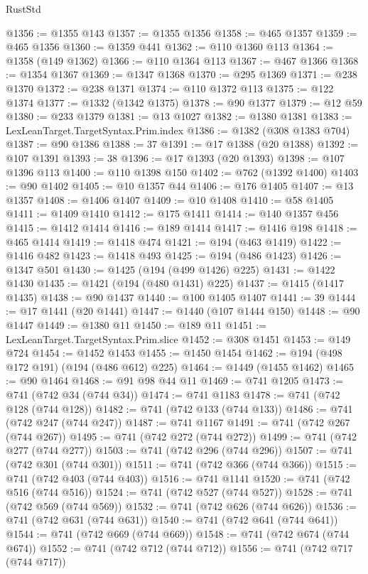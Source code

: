 \begin{lexlean}{RustStd}
\begin{coremodule}
@1356 := @1355 @143
@1357 := @1355 @1356
@1358 := @465 @1357
@1359 := @465 @1356
@1360 := @1359 @441
@1362 := @110 @1360 @113
@1364 := @1358 (@149 @1362)
@1366 := @110 @1364 @113
@1367 := @467 @1366
@1368 := @1354 @1367
@1369 := @1347 @1368
@1370 := @295 @1369
@1371 := @238 @1370
@1372 := @238 @1371
@1374 := @110 @1372 @113
@1375 := @122 @1374
@1377 := @1332 (@1342 @1375)
@1378 := @90 @1377
@1379 := @12 @59
@1380 := @233 @1379
@1381 := @13 @1027
@1382 := @1380 @1381
@1383 := LexLeanTarget.TargetSyntax.Prim.index
@1386 := @1382 (@308 @1383 @704)
@1387 := @90 @1386
@1388 := 37
@1391 := @17 @1388 (@20 @1388)
@1392 := @107 @1391
@1393 := 38
@1396 := @17 @1393 (@20 @1393)
@1398 := @107 @1396 @113
@1400 := @110 @1398 @150
@1402 := @762 (@1392 @1400)
@1403 := @90 @1402
@1405 := @10 @1357 @44
@1406 := @176 @1405
@1407 := @13 @1357
@1408 := @1406 @1407
@1409 := @10 @1408
@1410 := @58 @1405
@1411 := @1409 @1410
@1412 := @175 @1411
@1414 := @140 @1357 @456
@1415 := @1412 @1414
@1416 := @189 @1414
@1417 := @1416 @198
@1418 := @465 @1414
@1419 := @1418 @474
@1421 := @194 (@463 @1419)
@1422 := @1416 @482
@1423 := @1418 @493
@1425 := @194 (@486 @1423)
@1426 := @1347 @501
@1430 := @1425 (@194 (@499 @1426) @225)
@1431 := @1422 @1430
@1435 := @1421 (@194 (@480 @1431) @225)
@1437 := @1415 (@1417 @1435)
@1438 := @90 @1437
@1440 := @100 @1405 @1407
@1441 := 39
@1444 := @17 @1441 (@20 @1441)
@1447 := @1440 (@107 @1444 @150)
@1448 := @90 @1447
@1449 := @1380 @11
@1450 := @189 @11
@1451 := LexLeanTarget.TargetSyntax.Prim.slice
@1452 := @308 @1451
@1453 := @149 @724
@1454 := @1452 @1453
@1455 := @1450 @1454
@1462 := @194 (@498 @172 @191) (@194 (@486 @612) @225)
@1464 := @1449 (@1455 @1462)
@1465 := @90 @1464
@1468 := @91 @98 @44 @11
@1469 := @741 @1205
@1473 := @741 (@742 @34 (@744 @34))
@1474 := @741 @1183
@1478 := @741 (@742 @128 (@744 @128))
@1482 := @741 (@742 @133 (@744 @133))
@1486 := @741 (@742 @247 (@744 @247))
@1487 := @741 @1167
@1491 := @741 (@742 @267 (@744 @267))
@1495 := @741 (@742 @272 (@744 @272))
@1499 := @741 (@742 @277 (@744 @277))
@1503 := @741 (@742 @296 (@744 @296))
@1507 := @741 (@742 @301 (@744 @301))
@1511 := @741 (@742 @366 (@744 @366))
@1515 := @741 (@742 @403 (@744 @403))
@1516 := @741 @1141
@1520 := @741 (@742 @516 (@744 @516))
@1524 := @741 (@742 @527 (@744 @527))
@1528 := @741 (@742 @569 (@744 @569))
@1532 := @741 (@742 @626 (@744 @626))
@1536 := @741 (@742 @631 (@744 @631))
@1540 := @741 (@742 @641 (@744 @641))
@1544 := @741 (@742 @669 (@744 @669))
@1548 := @741 (@742 @674 (@744 @674))
@1552 := @741 (@742 @712 (@744 @712))
@1556 := @741 (@742 @717 (@744 @717))

\end{coremodule}
\end{lexlean}
